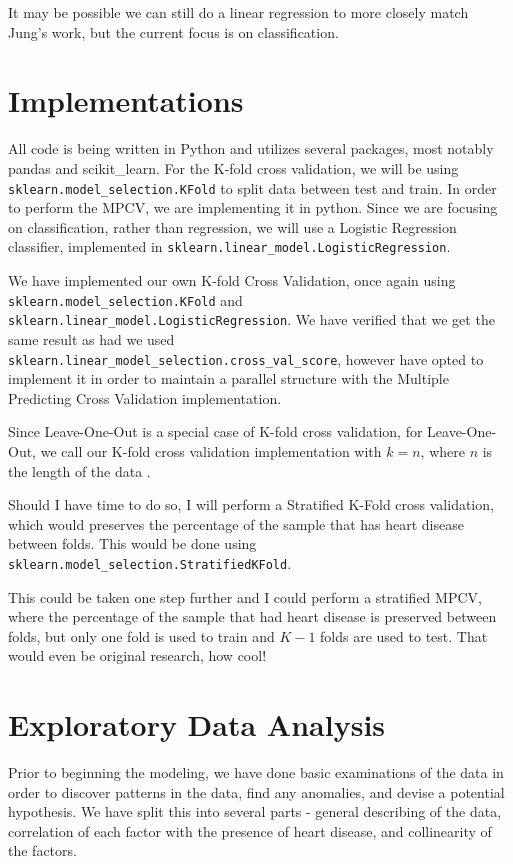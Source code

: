 \documentclass[letter]{article}
\def\code#1{\texttt{#1}}
\begin{document}
It may be possible we can still do a linear regression to more closely match Jung's work, but the current focus is on classification.
\section{Implementations}
All code is being written in Python and utilizes several packages, most notably pandas and scikit\_learn.  For the K-fold cross validation, we will be using \code{sklearn.model\_selection.KFold} to split data between test and train.  In order to perform the MPCV, we are implementing it in python.  Since we are focusing on classification, rather than regression, we will use a Logistic Regression classifier, implemented in  \code{sklearn.linear\_model.LogisticRegression}.

We have implemented our own K-fold Cross Validation, once again using \code{sklearn.model\_selection.KFold} and \code{sklearn.linear\_model.LogisticRegression}.  We have verified that we get the same result as had we used
 \code{sklearn.linear\_model\_selection.cross\_val\_score}, however have opted to implement it in order to 
 maintain a parallel structure
with the Multiple Predicting Cross Validation implementation.

Since Leave-One-Out is a special case of K-fold cross validation, for Leave-One-Out, we call our K-fold cross validation implementation with \(k=n\), where \(n\) is the length of the data \citep{Berrar_CrossValid}.

Should I have time to do so, I will perform a Stratified K-Fold cross validation, which would preserves the percentage of the sample that has heart disease between folds.  This would be done using \code{sklearn.model\_selection.StratifiedKFold}.

This could be taken one step further and I could perform a stratified MPCV, where the percentage of the sample that had heart disease is preserved between folds, but only one fold is used to train and \(K-1\) folds are used to test.  That would even be original research, how cool!

\section{Exploratory Data Analysis}
Prior to beginning the modeling, we have done basic examinations of the data in order to discover patterns in the data, find any anomalies, and devise a potential hypothesis.  We have split this into several parts - general describing of the data, correlation of each factor with the presence  of heart disease, and collinearity of the factors.
\end{document}
